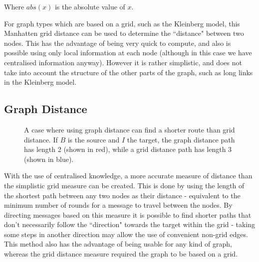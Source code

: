 \documentclass[bsc,frontabs,twoside,singlespacing,parskip,deptreport]{infthesis}     %
\begin{document}
Where $abs(x)$ is the absolute value of $x$.

For graph types which are based on a grid, such as the Kleinberg model, this Manhatten grid distance can be used to determine the ``distance" between two nodes. This has the advantage of being very quick to compute, and also is possible using only local information at each node (although in this case we have centralised information anyway). However it is rather simplistic, and does not take into account the structure of the other parts of the graph, such as long links in the Kleinberg model.


\subsection{Graph Distance} \label{subsec:graph_dist}

\begin{figure}
\centering
{}
\caption{A case where using graph distance can find a shorter route than grid distance. If $B$ is the source and $I$ the target, the graph distance path has length 2 (shown in red), while a grid distance path has length 3 (shown in blue).}
\label{fig:graph_dist_example}
\end{figure}

With the use of centralised knowledge, a more accurate measure of distance than the simplistic grid measure can be created. This is done by using the length of the shortest path between any two nodes as their distance - equivalent to the minimum number of rounds for a message to travel between the nodes. By directing messages based on this measure it is possible to find shorter paths that don't necessarily follow the ``direction" towards the target within the grid - taking some steps in another direction may allow the use of convenient non-grid edges. This method also has the advantage of being usable for any kind of graph, whereas the grid distance measure required the graph to be based on a grid.
\end{document}
